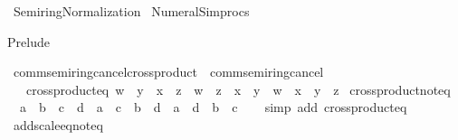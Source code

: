%
\begin{isabellebody}%
%
%
\isadelimdocument
%
\endisadelimdocument
%
\isatagdocument
%
\isamarkuptrue%
%
\endisatagdocument
{\isafolddocument}%
%
\isadelimdocument
%
\endisadelimdocument
%
\isadelimtheory
%
\endisadelimtheory
%
\isatagtheory
{}\isamarkupfalse%
\ Semiring{\isacharunderscore}{\kern0pt}Normalization\isanewline
{}\ Numeral{\isacharunderscore}{\kern0pt}Simprocs\isanewline
{}%
\endisatagtheory
{\isafoldtheory}%
%
\isadelimtheory
%
\endisadelimtheory
%
\begin{isamarkuptext}%
Prelude%
\end{isamarkuptext}\isamarkuptrue%
\isamarkupfalse%
\ comm{\isacharunderscore}{\kern0pt}semiring{\isacharunderscore}{\kern0pt}{}{\isacharunderscore}{\kern0pt}cancel{\isacharunderscore}{\kern0pt}crossproduct\ {\isacharequal}{\kern0pt}\ comm{\isacharunderscore}{\kern0pt}semiring{\isacharunderscore}{\kern0pt}{}{\isacharunderscore}{\kern0pt}cancel\ {\isacharplus}{\kern0pt}\isanewline
\ \ \ crossproduct{\isacharunderscore}{\kern0pt}eq{\isacharcolon}{\kern0pt}\ {\isachardoublequoteopen}w\ {\isacharasterisk}{\kern0pt}\ y\ {\isacharplus}{\kern0pt}\ x\ {\isacharasterisk}{\kern0pt}\ z\ {\isacharequal}{\kern0pt}\ w\ {\isacharasterisk}{\kern0pt}\ z\ {\isacharplus}{\kern0pt}\ x\ {\isacharasterisk}{\kern0pt}\ y\ {\isasymlongleftrightarrow}\ w\ {\isacharequal}{\kern0pt}\ x\ {\isasymor}\ y\ {\isacharequal}{\kern0pt}\ z{\isachardoublequoteclose}\isanewline
{}\isanewline
\isanewline
{}\isamarkupfalse%
\ crossproduct{\isacharunderscore}{\kern0pt}noteq{\isacharcolon}{\kern0pt}\isanewline
\ \ {\isachardoublequoteopen}a\ {\isasymnoteq}\ b\ {\isasymand}\ c\ {\isasymnoteq}\ d\ {\isasymlongleftrightarrow}\ a\ {\isacharasterisk}{\kern0pt}\ c\ {\isacharplus}{\kern0pt}\ b\ {\isacharasterisk}{\kern0pt}\ d\ {\isasymnoteq}\ a\ {\isacharasterisk}{\kern0pt}\ d\ {\isacharplus}{\kern0pt}\ b\ {\isacharasterisk}{\kern0pt}\ c{\isachardoublequoteclose}\isanewline
%
\isadelimproof
\ \ %
\endisadelimproof
%
\isatagproof
{}\isamarkupfalse%
\ {\isacharparenleft}{\kern0pt}simp\ add{\isacharcolon}{\kern0pt}\ crossproduct{\isacharunderscore}{\kern0pt}eq{\isacharparenright}{\kern0pt}%
\endisatagproof
{\isafoldproof}%
%
\isadelimproof
\isanewline
%
\endisadelimproof
\isanewline
{}\isamarkupfalse%
\ add{\isacharunderscore}{\kern0pt}scale{\isacharunderscore}{\kern0pt}eq{\isacharunderscore}{\kern0pt}noteq{\isacharcolon}{\kern0pt}\isanewline

\end{isabellebody}
